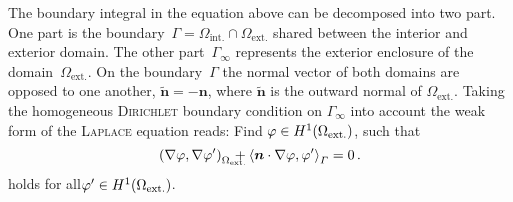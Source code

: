 The boundary integral in the equation above can be decomposed into two part. One part is the boundary~$\varGamma=\varOmega_\mathrm{int.}\cap\varOmega_\mathrm{ext.}$ shared between the interior and exterior domain. The other part~$\varGamma_\infty$ represents the exterior enclosure of the domain~$\varOmega_\mathrm{ext.}$. On the boundary~$\varGamma$ the normal vector of both domains are opposed to one another, \ie $\tilde{\bm{n}}=-\bm{n}$, where $\tilde{\bm{n}}$ is the outward normal of $\varOmega_\mathrm{ext.}$. Taking the homogeneous \textsc{Dirichlet} boundary condition on $\varGamma_\infty$ into account the weak form of the \textsc{Laplace} equation reads: Find $\varphi\in H^1(\Omega_\mathrm{ext.})$, such that
\begin{equation}
	\label{eqn:WeakFormPhi}
	\left(\nabla\vp,\nabla\vp'\right)_{\mathrlap{\Omega_\mathrm{ext.}}\ \ }
	+\left\langle\bm{n}\cdot\nabla\vp,\vp'\right\rangle_{\varGamma}=0\,.
\end{equation}
holds for all$\varphi'\in H^1(\Omega_\mathrm{ext.})$.

